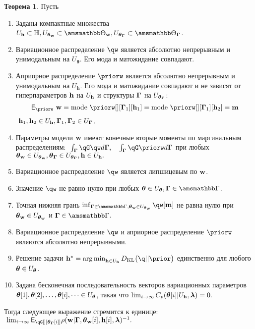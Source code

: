 \documentclass[11pt, a5paper]{dissert}
\theoremstyle{definition}
\newtheorem{theorem}{Теорема}
\DeclareMathOperator*{\argmin}{arg\,min}
\begin{document}
{\begin{theorem}
Пусть
\begin{enumerate}

\item Заданы компактные множества $\Uh \subset \Hb, \Utetaw \subset \Tetawb, \UtetaG \subset \TetaGb$.

\item Вариационное распределение $\qw$  является абсолютно непрерывным и унимодальным на  $U_{\boldsymbol{\theta}}$.
Его мода и матожидание совпадают.




\item Априорное распределение $\priorw$ является абсолютно непрерывным и унимодальным на  $U_\mathbf{h}$. Его мода и матожидание совпадают и не зависят от гиперпараметров $\mathbf{h}$  на $U_{\mathbf{h}}$ и структуры $\boldsymbol{\Gamma}$ на $U_{\boldsymbol{\theta}_{\boldsymbol{\Gamma}}}$:
\[
\E_{\priorw}~\w = \text{mode}~\priorw[][\G_1][\h_1]=\text{mode}~\priorw[][\G_1][\h_2]=\mathbf{m}
\]
$~\mathbf{h}_1,\mathbf{h}_2 \in U_{\mathbf{h}}, \boldsymbol{\Gamma}_1,\boldsymbol{\Gamma}_2 \in U_{\boldsymbol{\Gamma}}$.


\item Параметры модели $\mathbf{w}$ имеют конечные вторые моменты по маргинальным распределениям:
$
   \int_{\G}\qG\qw d\G, \quad \int_{\G}\qG\priorw d\G
$
при любых $\boldsymbol{\theta}_\mathbf{w} \in U_{\boldsymbol{\theta}_\mathbf{w}}, \boldsymbol{\theta}_{\boldsymbol{\Gamma}} \in U_{\boldsymbol{\theta}_{\boldsymbol{\Gamma}}}, \mathbf{h} \in U_{\mathbf{h}}.$


\item Вариационное распределение $\qw$ является липшицевым по $\mathbf{w}$.

\item Значение $\qw$ не равно нулю при любых $\teta \in \Uteta, \G \in \Gb$.

\item Точная нижняя грань $\inf_{\G \in \Gb, \tetaw \in \Utetaw} \qw[\mathbf{m}]$ не равна нулю при $\boldsymbol{\theta}_\mathbf{w} \in U_{\boldsymbol{\theta}_\mathbf{w}}$ и $\G \in \Gb$.

\item Вариационное распределение $\qw$ и априорное распределение $\priorw$  являются абсолютно непрерывными.

\item Решение задачи $
\h^{*} = \argmin_{\h \in \Uh} \KL{\q}{\prior}$ единственно для любого $\boldsymbol{\theta} \in U_{\boldsymbol{\theta}}$.



\item Задана  бесконечная последовательность векторов вариационных параметров $\boldsymbol{\theta}[1],\boldsymbol{\theta}[2],\dots,\boldsymbol{\theta}[i],\dots \in U_{\boldsymbol{\theta}}$, такая что $\lim_{i \to \infty}C_p(\boldsymbol{\theta}[i]|U_{\mathbf{h}},\boldsymbol{\lambda}) = 0.$
\end{enumerate}
Тогда следующее выражение стремится к единице:
$
   \lim_{i \to \infty} \E_{\qG[][{\tetaG[i]}]} {\rho}(\w|\G, {\tetaw[i]}, {\h[i]}, \lam)^{-1}.
$


\end{theorem}}
\end{document}
